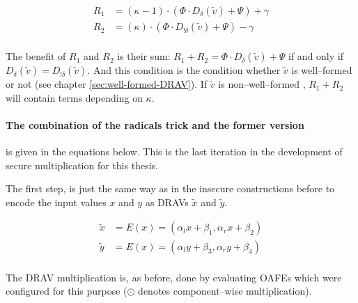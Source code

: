 \begin{align*}
  R_1 & = (\kappa -1)\cdot(\Phi \cdot D_\delta(\widetilde{v})+\Psi) + \gamma \\
  R_2 & = (\kappa)\cdot(\Phi \cdot D_{!\delta}(\widetilde{v})+\Psi) - \gamma \\
\end{align*}

The benefit of $R_1$ and $R_2$ is their sum: $R_1 + R_2 = \Phi \cdot
D_\delta(\widetilde{v}) + \Psi$ if and only if $D_\delta(\widetilde{v}) =
D_{!\delta}(\widetilde{v})$. And this condition is the condition whether
$\widetilde{v}$ is well--formed or not (see chapter \ref{sec:well-formed-DRAV}).
If $\widetilde{v}$ is non--well--formed , $R_1 + R_2$ will contain terms
depending on $\kappa$.

\paragraph{The combination of the radicals trick and the former version} is
given in the equations below. This is the last iteration in the development of
secure multiplication for this thesis.

The first step, is just the same way as in the insecure constructions
before to encode the input values $x$ and $y$ as DRAVs $\widetilde{x}$ and
$\widetilde{y}$.

\begin{align*}
  \widetilde{x} & = E(x) = (\alpha_l x + \beta_1, \alpha_r x + \beta_2) \\
  \widetilde{y} & = E(x) = (\alpha_l y + \beta_3, \alpha_r y + \beta_4) \\
\end{align*}

\noindent{}The DRAV multiplication is, as before, done by evaluating OAFEs which
were configured for this purpose ($\odot$ denotes component--wise
multiplication).


